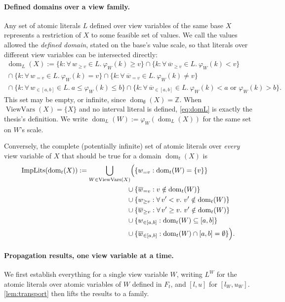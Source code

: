 \documentclass[11pt,a4paper]{article}
\theoremstyle{plain}
\theoremstyle{definition}
\theoremstyle{remark}
\newcommand{\fname}[1]{\ensuremath{\operatorname{#1}}}
\newcommand{\ViewVars}{\fname{ViewVars}}
\newcommand{\dm}{\fname{dom}}
\newcommand{\ImpLits}{\fname{ImpLits}}
\newcommand{\atge}[2]{#1_{\geq #2}}
\newcommand{\ateq}[2]{#1_{= #2}}
\newcommand{\atin}[3]{#1_{\in[#2,#3]}}
\newcommand{\natge}[2]{\overline{#1}_{\geq #2}}
\newcommand{\nateq}[2]{\overline{#1}_{= #2}}
\newcommand{\natin}[3]{\overline{#1}_{\in[#2,#3]}}
\begin{document}
\paragraph{Defined domains over a view family.}
Any set of atomic literals $L$ defined over view variables of the same base
$X$ represents a restriction of $X$ to some feasible set of values.  We call
the values allowed the \emph{defined domain}, stated on the base's value scale,
so that literals over different view variables can be intersected directly:
\begin{multline}
  \dm_L(X) := \{k : \forall\,\atge{w}{v}\in L .\ \varphi_W(k)\geq v\}
      \cap \{k : \forall\,\natge{w}{v}\in L .\ \varphi_W(k)< v\} \\
    {}\cap \{k : \forall\,\ateq{w}{v}\in L .\ \varphi_W(k) = v\}
      \cap \{k : \forall\,\nateq{w}{v}\in L .\ \varphi_W(k)\neq v\} \\
    {}\cap \{k : \forall\,\atin{w}{a}{b}\in L .\ a\leq\varphi_W(k)\leq b\}
      \cap \{k : \forall\,\natin{w}{a}{b}\in L .\
        \varphi_W(k)<a \text{ or } \varphi_W(k)>b\}.
  \label{eq:domL}
\end{multline}
This set may be empty, or infinite, since $\dm_{\emptyset}(X)=\mathbb Z$.  When
$\ViewVars(X)=\{X\}$ and no interval literal is defined, \cref{eq:domL} is exactly
the thesis's definition.  We write $\dm_L(W) := \varphi_W(\dm_L(X))$ for the
same set on $W$'s scale.

Conversely, the complete (potentially infinite) set of atomic literals over
\emph{every} view variable of $X$ that should be true for a domain
$\dm_t(X)$ is
\begin{align}
  \ImpLits(\dm_t(X)) := \bigcup_{W\in\ViewVars(X)}\Bigl(
    &\{\ateq{w}{v} : \dm_t(W)=\{v\}\} \notag\\
    {}\cup{}&\{\nateq{w}{v} : v\notin\dm_t(W)\} \notag\\
    {}\cup{}&\{\atge{w}{v} : \forall\,v'<v .\ v'\notin\dm_t(W)\} \notag\\
    {}\cup{}&\{\natge{w}{v} : \forall\,v'\geq v .\ v'\notin\dm_t(W)\} \notag\\
    {}\cup{}&\{\atin{w}{a}{b} : \dm_t(W)\subseteq[a,b]\} \notag\\
    {}\cup{}&\{\natin{w}{a}{b} : \dm_t(W)\cap[a,b]=\emptyset\}\Bigr).
  \label{eq:implits}
\end{align}

\paragraph{Propagation results, one view variable at a time.}
We first establish everything for a single view variable $W$, writing $L^W$ for
the atomic literals over atomic variables of $W$ defined in $F_t$, and $[l,u]$
for $[l_W,u_W]$.  \cref{lem:transport} then lifts the results to a family.
\end{document}
